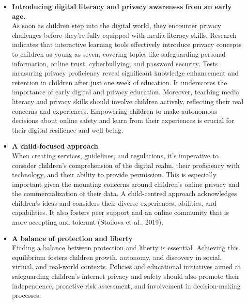 \documentclass[a4paper, 10 pt, conference]{ieeeconf}  %
\begin{document}
\begin{itemize}

\item \textbf{Introducing digital literacy and privacy awareness from an early age.}
\\ As soon as children step into the digital world, they encounter privacy challenges before they’re fully equipped with media literacy skills. Research indicates that interactive learning tools effectively introduce privacy concepts to children as young as seven, covering topics like safeguarding personal information, online trust, cyberbullying, and password security. Tests measuring privacy proficiency reveal significant knowledge enhancement and retention in children after just one week of education. It underscores the importance of early digital and privacy education. Moreover, teaching media literacy and privacy skills should involve children actively, reflecting their real concerns and experiences. Empowering children to make autonomous decisions about online safety and learn from their experiences is crucial for their digital resilience and well-being.
\item \textbf{A child-focused approach}
\\ When creating services, guidelines, and regulations, it’s imperative to consider children’s comprehension of the digital realm, their proficiency with technology, and their ability to provide permission. This is especially important given the mounting concerns around children's online privacy and the commercialization of their data. A child-centred approach acknowledges children’s ideas and considers their diverse experiences, abilities, and capabilities. It also fosters peer support and an online community that is more accepting and tolerant (Stoilova et al., 2019).
\item \textbf{A balance of protection and liberty}
\\ Finding a balance between protection and liberty is essential. Achieving this equilibrium fosters children growth, autonomy, and discovery in social, virtual, and real-world contexts. Policies and educational initiatives aimed at safeguarding children’s internet privacy and safety should also promote their independence, proactive risk assessment, and involvement in decision-making processes. 
\end{itemize}
\end{document}
